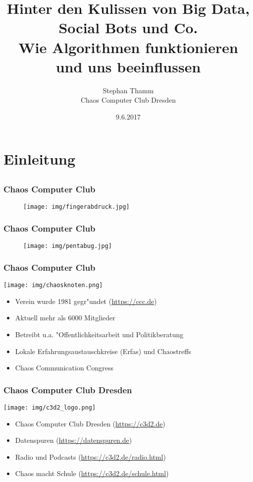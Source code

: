 \documentclass[12pt]{beamer}
\title{\normalsize Hinter den Kulissen von Big Data, Social Bots und Co. \\ Wie Algorithmen funktionieren
und uns beeinflussen}
\author{\small Stephan Thamm\\\large Chaos Computer Club Dresden}
\date{9.6.2017}
\begin{document}
\maketitle

\section{Einleitung}
\subsection{}

\begin{frame}
  \frametitle{Chaos Computer Club}
  \begin{figure}
    \texttt{[image: img/fingerabdruck.jpg]}
  \end{figure}
\end{frame}

\begin{frame}
  \frametitle{Chaos Computer Club}
  \begin{figure}
    \texttt{[image: img/pentabug.jpg]}
  \end{figure}
\end{frame}

\begin{frame}
    \frametitle{Chaos Computer Club}
    \begin{center}
  \texttt{[image: img/chaosknoten.png]}
    \end{center}
    \begin{itemize}
      \item<1-> Verein wurde 1981 gegr"undet (\url{https://ccc.de})
      \item<2-> Aktuell mehr als 6000 Mitglieder
      \item<3-> Betreibt u.a. "Offentlichkeitsarbeit und Politikberatung
      \item<4-> Lokale Erfahrungsaustauschkreise (Erfas) und Chaostreffs
      \item<5-> Chaos Communication Congress
    \end{itemize}
\end{frame}

\begin{frame}
  \frametitle{Chaos Computer Club Dresden}
  \begin{center}
    \texttt{[image: img/c3d2\_logo.png]}
  \end{center}
  \begin{itemize}
    \item<1-> Chaos Computer Club Dresden (\url{https://c3d2.de})
    \item<2-> Datenspuren (\url{https://datenspuren.de})
    \item<3-> Radio und Podcasts (\url{https://c3d2.de/radio.html})
    \item<4-> Chaos macht Schule (\url{https://c3d2.de/schule.html})
  \end{itemize}
\end{frame}
\end{document}
